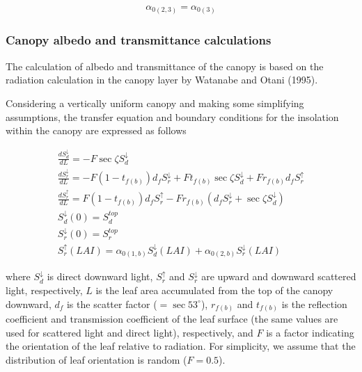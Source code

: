 \begin{eqnarray}
 \alpha_{0(2,3)} = \alpha_{0(3)}
\end{eqnarray}

\hypertarget{canopy-albedo-and-transmittance-calculations}{%
\subsubsection{Canopy albedo and transmittance
calculations}\label{canopy-albedo-and-transmittance-calculations}}

The calculation of albedo and transmittance of the canopy is based on
the radiation calculation in the canopy layer by Watanabe and Otani
(1995).

Considering a vertically uniform canopy and making some simplifying
assumptions, the transfer equation and boundary conditions for the
insolation within the canopy are expressed as follows

\begin{eqnarray}
 \frac{dS^{\downarrow}_d}{dL} = -F \sec\zeta S^{\downarrow}_d \\
 \frac{dS^{\downarrow}_r}{dL} = -F (1-t_{f(b)})d_f S^{\downarrow}_r
                                  +F t_{f(b)} \sec\zeta S^{\downarrow}_d
                                  +F r_{f(b)} d_f S^{\uparrow}_r \\
 \frac{dS^{\uparrow}_r}{dL}   =  F (1-t_{f(b)})d_f S^{\uparrow}_r
                                  -F r_{f(b)} ( d_f S^{\downarrow}_r
                                         + \sec\zeta S^{\downarrow}_d ) \\
 S^{\downarrow}_d(0) = S^{top}_d \\
 S^{\downarrow}_r(0) = S^{top}_r \\
 S^{\uparrow}_r(LAI) = \alpha_{0(1,b)}S^{\downarrow}_d(LAI)
                       + \alpha_{0(2,b)}S^{\downarrow}_r(LAI)
\end{eqnarray}

where \(S^{\downarrow}_d\) is direct downward light, \(S^{\uparrow}_r\)
and \(S^{\downarrow}_r\) are upward and downward scattered light,
respectively, \(L\) is the leaf area accumulated from the top of the
canopy downward, \(d_f\) is the scatter factor (\(=\sec 53^{\circ}\)),
\(r_{f(b)}\) and \(t_{f(b)}\) is the reflection coefficient and
transmission coefficient of the leaf surface (the same values are used
for scattered light and direct light), respectively, and \(F\) is a
factor indicating the orientation of the leaf relative to radiation. For
simplicity, we assume that the distribution of leaf orientation is
random (\(F=0.5\)).

